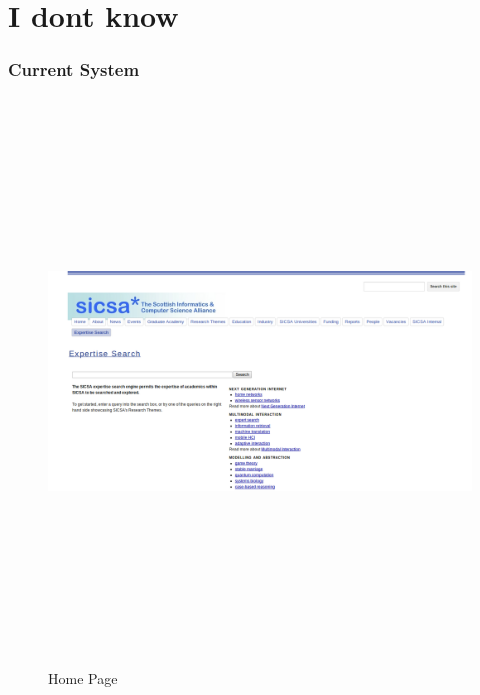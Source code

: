 
\section{I dont know}

\subsubsection{Current System}\label{sec:currentsystem}

\begin{figure}
 \centering
\includegraphics[width=13cm,height=15cm,keepaspectratio]{./figures/oldsicsa.png}
 \caption{Home Page} \label{fig:oldsicsa} 
 \end{figure}
